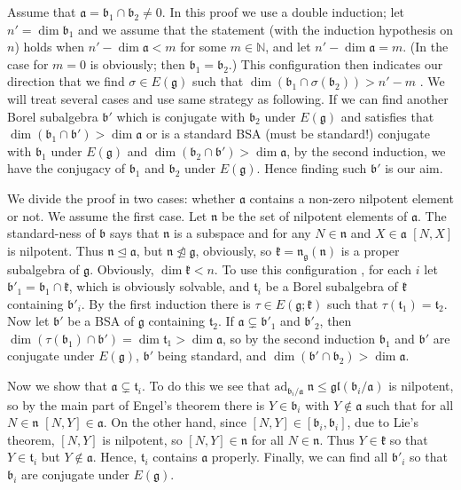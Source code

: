 \documentclass{article}
\newcommand{\NaN}{\mathbb{N}}
\newcommand{\lie}[1]{\mathfrak{#1}}
\newcommand{\adu}[2]{\mathrm{ad}_{#1}\; #2}
\begin{document}
Assume that $\lie{a} = \lie{b}_1 \cap \lie{b}_2 \ne 0$.
In this proof we use a double induction; let $n' = \dim{\lie{b}_1}$ and we assume that the statement (with the induction hypothesis on $n$) holds when $n' - \dim{\lie{a}} < m$ for some $m \in \NaN$, and let $n' - \dim{\lie{a}} = m$.
(In the case for $m = 0$ is obviously; then $\lie{b}_1 = \lie{b}_2$.)
This configuration then indicates our direction that we find $\sigma \in E(\lie{g})$ such that $\dim{(\lie{b}_1 \cap \sigma(\lie{b}_2))} > n' - m$ .
We will treat several cases and use same strategy as following.
If we can find another Borel subalgebra $\lie{b}'$ which is conjugate with $\lie{b}_2$ under $E(\lie{g})$ and satisfies that $\dim{(\lie{b}_1 \cap \lie{b}')} > \dim{\lie{a}}$ or is a standard BSA (must be standard!) conjugate with $\lie{b}_1$ under $E(\lie{g})$ and $\dim{(\lie{b}_2 \cap \lie{b}')} > \dim{\lie{a}}$, by the second induction, we have the conjugacy of $\lie{b}_1$ and $\lie{b}_2$ under $E(\lie{g})$.
Hence finding such $\lie{b}'$ is our aim.

We divide the proof in two cases: whether $\lie{a}$ contains a non-zero nilpotent element or not.
We assume the first case.
Let $\lie{n}$ be the set of nilpotent elements of $\lie{a}$.
The standard-ness of $\lie{b}$ says that $\lie{n}$ is a subspace and for any $N \in \lie{n}$ and $X \in \lie{a}$ $[N, X]$ is nilpotent.
Thus $\lie{n} \trianglelefteq \lie{a}$, but $\lie{n} \not\trianglelefteq \lie{g}$, obviously, so $\lie{k} = \lie{n}_\lie{g}(\lie{n})$ is a proper subalgebra of $\lie{g}$.
Obviously, $\dim{\lie{k}} < n$.
To use this configuration , for each $i$ let $\lie{b}'_1 = \lie{b}_1 \cap \lie{k}$, which is obviously solvable, and $\lie{t}_i$ be a Borel subalgebra of $\lie{k}$ containing $\lie{b}'_i$.
By the first induction there is $\tau \in E(\lie{g}; \lie{k})$ such that $\tau(\lie{t}_1) = \lie{t}_2$.
Now let $\lie{b}'$ be a BSA of $\lie{g}$ containing $\lie{t}_2$.
If $\lie{a} \subsetneq \lie{b}'_1$ and $\lie{b}'_2$, then $\dim{(\tau(\lie{b}_1) \cap \lie{b}')} = \dim{\lie{t}_1} > \dim{\lie{a}}$, so by the second induction $\lie{b}_1$ and $\lie{b}'$ are conjugate under $E(\lie{g})$, $\lie{b}'$ being standard, and $\dim{(\lie{b}' \cap \lie{b}_2)} > \dim{\lie{a}}$.

Now we show that $\lie{a} \subsetneq \lie{t}_i$.
To do this we see that $\adu{\lie{b}_i/\lie{a}}{\lie{n}} \le \lie{gl}(\lie{b}_i/\lie{a})$ is nilpotent, so by the main part of Engel's theorem there is $Y \in \lie{b}_i$ with $Y \notin \lie{a}$ such that for all $N \in \lie{n}$ $[N, Y] \in \lie{a}$.
On the other hand, since $[N, Y] \in [\lie{b}_i, \lie{b}_i]$, due to Lie's theorem, $[N, Y]$ is nilpotent, so $[N, Y] \in \lie{n}$ for all $N \in \lie{n}$.
Thus $Y \in \lie{k}$ so that $Y \in \lie{t}_i$ but $Y \notin \lie{a}$.
Hence, $\lie{t}_i$ contains $\lie{a}$ properly.
Finally, we can find all $\lie{b}'_i$ so that $\lie{b}_i$ are conjugate under $E(\lie{g})$.
\end{document}
